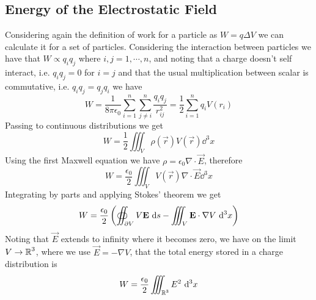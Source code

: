 \documentclass[../electromagnetism]{subfiles}
\begin{document}
\subsection{Energy of the Electrostatic Field}
Considering again the definition of work for a particle as $W=q\Delta V$ we can calculate it for a set of particles. Considering the interaction between particles we have that $W\propto q_iq_j$ where $i,j=1,\cdots,n$, and noting that a charge doesn't self interact, i.e. $q_iq_j=0$ for $i=j$ and that the usual multiplication between scalar is commutative, i.e. $q_iq_j=q_jq_i$ we have
\begin{equation}
	W=\frac{1}{8\pi\epsilon_0}\sum_{i=1}^n\sum_{j\ne i}^n\frac{q_iq_j}{r_{ij}^2}=\frac{1}{2}\sum_{i=1}^nq_iV(r_i)
	\label{eq:ensyspart}
\end{equation}
Passing to continuous distributions we get
\begin{equation*}
	W=\frac{1}{2}\iiint_V\rho(\vec{r})V(\vec{r})\dd^3x
\end{equation*}
Using the first Maxwell equation we have $\rho=\epsilon_0\nabla\cdot\vec{E}$, therefore
\begin{equation*}
	W=\frac{\epsilon_0}{2}\iiint_VV(\vec{r})\nabla\cdot\vec{E}\dd^3x
\end{equation*}
Integrating by parts and applying Stokes' theorem we get
\begin{equation}
	W=\frac{\epsilon_0}{2}\left( \oiint_{\partial V}V\mathbf{E}\ \mathrm{d} s-\iiint_V\mathbf{E}\cdot\nabla V\ \mathrm{d}^3x \right)
	\label{eq:energyvolume}
\end{equation}
Noting that $\vec{E}$ extends to infinity where it becomes zero, we have on the limit $V\to\operatorname{\mathbb{R}}^3$, where we use $\vec{E}=-\nabla V$, that the total energy stored in a charge distribution is
\begin{equation}
	W=\frac{\epsilon_0}{2}\iiint_{\operatorname{\mathbb{R}}^3}E^2\ \mathrm{d}^3x
	\label{eq:totalenergy}
\end{equation}
\end{document}

